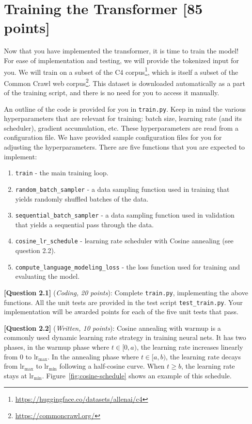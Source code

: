 \documentclass[leqno,12pt]{article}
\begin{document}
\section{Training the Transformer [85 points]}

Now that you have implemented the transformer, it is time to train the model! For ease of implementation and testing, we will provide the tokenized input for you. We will train on a subset of the C4 corpus\footnote{\url{https://huggingface.co/datasets/allenai/c4}}, which is itself a subset of the Common Crawl web corpus\footnote{\url{https://commoncrawl.org/}}. This dataset is downloaded automatically as a part of the training script, and there is no need for you to access it manually. \newline

An outline of the code is provided for you in \texttt{train.py}.
Keep in mind the various hyperparameters that are relevant for training: batch size, learning rate (and its scheduler), gradient accumulation, etc. These hyperparameters are read from a configuration file. We have provided sample configuration files for you for adjusting the hyperparameters.
There are five functions that you are expected to implement:
\begin{enumerate}
    \item \texttt{train} - the main training loop.
    \item \texttt{random\_batch\_sampler} - a data sampling function used in training that yields randomly shuffled batches of the data.
    \item \texttt{sequential\_batch\_sampler} - a data sampling function used in validation that yields a sequential pass through the data.
    \item \texttt{cosine\_lr\_schedule} - learning rate scheduler with Cosine annealing (see question 2.2).
    \item \texttt{compute\_language\_modeling\_loss} - the loss function used for training and evaluating the model.
\end{enumerate}

\noindent \textbf{[Question 2.1]} (\emph{Coding, 20 points}): Complete \texttt{train.py}, implementing the above functions.
All the unit tests are provided in the test script \texttt{test\_train.py}. Your implementation will be awarded points for each of the five unit tests that pass.
\newline

\noindent \textbf{[Question 2.2]} (\emph{Written, 10 points}): Cosine annealing with warmup is a commonly used dynamic learning rate strategy in training neural nets. It has two phases, in the warmup phase where $t \in [0,a)$, the learning rate increases linearly from 0 to $\mathrm{lr}_\text{max}$. In the annealing phase where $t \in [a,b)$, the learning rate decays from $\mathrm{lr}_\text{max}$ to $\mathrm{lr}_\text{min}$ following a half-cosine curve. When $t \ge b$, the learning rate stays at $\mathrm{lr}_\text{min}$. Figure~\ref{fig:cosine-schedule} shows an example of this schedule.
\end{document}
